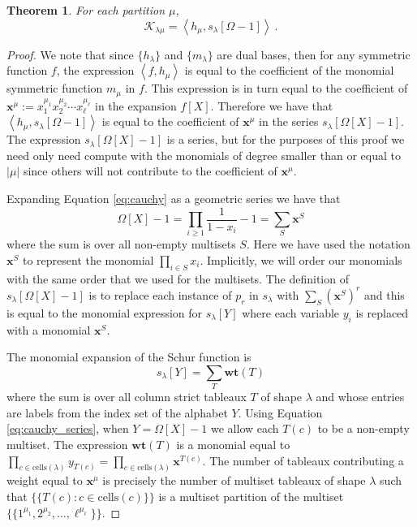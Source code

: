 \documentclass{amsart}
\newtheorem{theorem}[lemma]{Theorem}
\theoremstyle{definition}
\newcommand{\lcr}{\{\!\!\{}
\newcommand{\rcr}{\}\!\!\}}
\begin{document}
\begin{theorem}\label{thm:combinatorial}
For each partition $\mu$,
\[
{\mathcal K}_{\lambda\mu} = \left< h_\mu, s_\lambda[\Omega - 1] \right>~.
\]
\end{theorem}
\begin{proof}
We note that since $\{ h_\lambda \}$ and $\{m_\lambda\}$
are dual bases, then for any symmetric function $f$, the expression
$\left< f, h_\mu \right>$ is equal to the coefficient
of the monomial symmetric function $m_\mu$ in $f$.  This
expression is in turn equal to the coefficient
of ${\mathbf x}^\mu:=x_1^{\mu_1} x_2^{\mu_2} \cdots x_\ell^{\mu_\ell}$
in the expansion $f[X]$.  Therefore we have that $\left< h_\mu, s_\lambda[\Omega-1]\right>$
is equal to the coefficient of ${\mathbf x}^\mu$ in
the series $s_\lambda[\Omega[X]-1]$.  The expression $s_\lambda[\Omega[X]-1]$ is a series, but for
the purposes of this proof we need only need compute with the monomials of degree
smaller than or equal to $|\mu|$ since others will not contribute to the coefficient
of ${\mathbf x}^\mu$.

Expanding Equation \eqref{eq:cauchy} as a geometric series we have that
\begin{equation}\label{eq:cauchy_series}
\Omega[X]-1 = \prod_{i\geq 1} \frac{1}{1-x_i} -1 = \sum_{S} {\mathbf x}^S
\end{equation}
where the sum is over all non-empty multisets $S$.  Here
we have used the notation ${\mathbf x}^S$ to represent the monomial
$\prod_{i \in S} x_i$.
Implicitly, we will order our monomials with the same
order that we used for the multisets.
The definition of $s_\lambda[\Omega[X]-1]$ is to replace
each instance of $p_r$ in $s_\lambda$ with
$\sum_{S} ({\mathbf x}^{S})^r$ and this is equal to the monomial
expression for $s_\lambda[Y]$ where each variable $y_i$
is replaced with a monomial ${\mathbf x}^S$.

The monomial expansion of the Schur function
\cite[Equation (5.12)]{Macdonald} is
\[
s_\lambda[Y] = \sum_T {\mathbf{wt}}(T)
\]
where the sum is over all column strict tableaux $T$ of shape
$\lambda$ and whose entries are labels from the index set of
the alphabet $Y$.  Using Equation \eqref{eq:cauchy_series}, when $Y = \Omega[X]-1$
we allow each $T(c)$ to be a non-empty multiset.
The expression ${\mathbf{wt}}(T)$ is a
monomial equal to $\prod_{c \in {\mathrm{cells}}(\lambda)} y_{T(c)} =
\prod_{c \in {\mathrm{cells}}(\lambda)} {\mathbf x}^{T(c)}$.
The number of tableaux contributing a weight equal to
${\mathbf x}^\mu$ is precisely the number of
multiset tableaux of shape $\lambda$ such that
$\lcr T(c) : c \in {\mathrm{cells}}(c) \rcr$ is a
multiset partition of the multiset
$\lcr 1^{\mu_1}, 2^{\mu_2}, \ldots, \ell^{\mu_\ell} \rcr$.
\end{proof}
\end{document}
